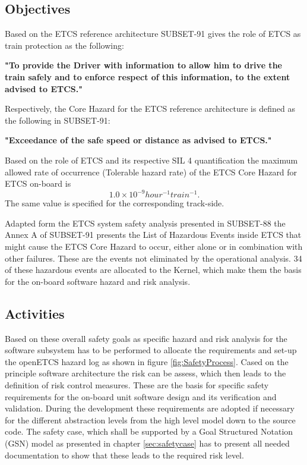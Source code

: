 \documentclass{template/openetcs_report}
\begin{document}
\subsection{Objectives}

\label{sec:ETCS-safety}

Based on the ETCS reference architecture SUBSET-91 gives the role of ETCS as train protection as the following:

\begin{center}
\textbf{"To provide the Driver with information to allow  him to drive the train safely and to enforce respect of this information, to the extent advised to ETCS."}
\end{center}

Respectively, the Core Hazard for the ETCS reference architecture is defined as the following in SUBSET-91:
\begin{center}
\textbf{"Exceedance of the safe speed or distance as advised to ETCS."}
\end{center}

Based on the role of ETCS and its respective SIL 4 quantification the maximum allowed rate of occurrence (Tolerable hazard rate) of the ETCS Core Hazard for ETCS on-board is
\[1.0\times10^{-9} hour^{-1} train^{-1}.\]
The same value is specified for the corresponding track-side.

Adapted form the ETCS system safety analysis presented in SUBSET-88 the Annex A of SUBSET-91 presents the List of Hazardous Events inside ETCS that might cause the ETCS Core Hazard to occur, either alone or in combination with other failures. These are the events not eliminated by the operational analysis. 34 of these hazardous events are allocated to the Kernel, which make them the basis for the on-board software hazard and risk analysis. 

\subsection{Activities}

Based on these overall safety goals as specific hazard and risk analysis for the software subsystem has to be performed to allocate the requirements and set-up the openETCS hazard log as shown in figure \ref{fig:SafetyProcess}. Cased on the principle software architecture the risk can be assess, which then leads to the definition of risk control measures. These are the basis for specific safety requirements for the on-board unit software design and its verification and validation. During the development these requirements are adopted if necessary for the different abstraction levels from the high level model down to the source code. The safety case, which shall be supported by a Goal Structured Notation (GSN) \cite{GSNwebsite} model as presented in chapter \ref{sec:safetycase} has to present all needed documentation to show that these leads to the required risk level.
\end{document}
